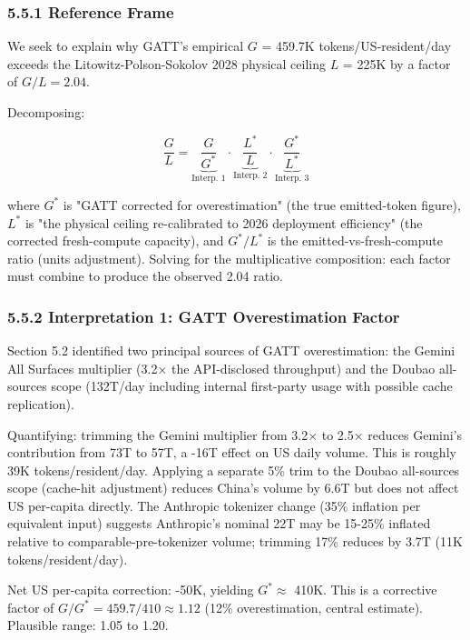\documentclass[11pt,a4paper]{article}
\begin{document}
\subsubsection{5.5.1 Reference Frame}

We seek to explain why GATT's empirical $G$ = 459.7K tokens/US-resident/day exceeds the Litowitz-Polson-Sokolov 2028 physical ceiling $L$ = 225K by a factor of $G/L = 2.04$.

Decomposing:

\begin{equation*}
\frac{G}{L} = \underbrace{\frac{G}{G^{*}}}_{\text{Interp. 1}} \cdot \underbrace{\frac{L^{*}}{L}}_{\text{Interp. 2}} \cdot \underbrace{\frac{G^{*}}{L^{*}}}_{\text{Interp. 3}}
\end{equation*}

where $G^{*}$ is "GATT corrected for overestimation" (the true emitted-token figure), $L^{*}$ is "the physical ceiling re-calibrated to 2026 deployment efficiency" (the corrected fresh-compute capacity), and $G^{*}/L^{*}$ is the emitted-vs-fresh-compute ratio (units adjustment). Solving for the multiplicative composition: each factor must combine to produce the observed 2.04 ratio.

\subsubsection{5.5.2 Interpretation 1: GATT Overestimation Factor}

Section 5.2 identified two principal sources of GATT overestimation: the Gemini All Surfaces multiplier (3.2× the API-disclosed throughput) and the Doubao all-sources scope (132T/day including internal first-party usage with possible cache replication).

Quantifying: trimming the Gemini multiplier from 3.2× to 2.5× reduces Gemini's contribution from 73T to 57T, a -16T effect on US daily volume. This is roughly 39K tokens/resident/day. Applying a separate 5\% trim to the Doubao all-sources scope (cache-hit adjustment) reduces China's volume by 6.6T but does not affect US per-capita directly. The Anthropic tokenizer change (35\% inflation per equivalent input) suggests Anthropic's nominal 22T may be 15-25\% inflated relative to comparable-pre-tokenizer volume; trimming 17\% reduces by 3.7T (11K tokens/resident/day).

Net US per-capita correction: -50K, yielding $G^{*} \approx$ 410K. This is a corrective factor of $G/G^{*} = 459.7 / 410 \approx 1.12$ (12\% overestimation, central estimate). Plausible range: 1.05 to 1.20.
\end{document}
